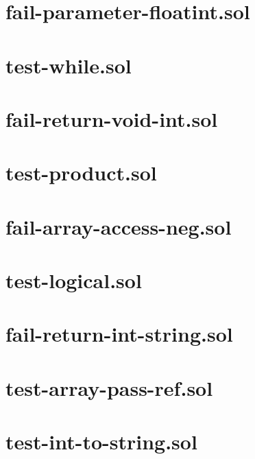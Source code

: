 \section{fail-parameter-floatint.sol}


\section{test-while.sol}


\section{fail-return-void-int.sol}


\section{test-product.sol}


\section{fail-array-access-neg.sol}


\section{test-logical.sol}


\section{fail-return-int-string.sol}


\section{test-array-pass-ref.sol}


\section{test-int-to-string.sol}


